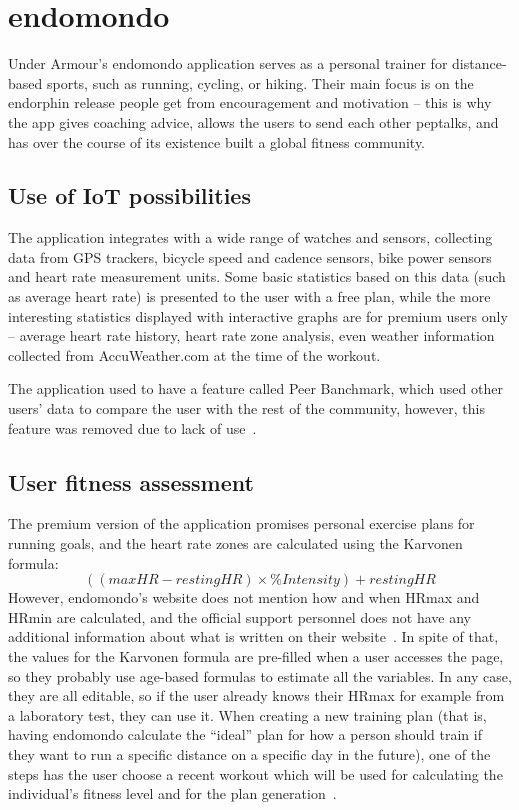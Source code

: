 \pagebreak
\section{endomondo}

Under Armour's endomondo application serves as a personal trainer for distance-based sports, such as running, cycling, or hiking.
Their main focus is on the endorphin release people get from encouragement and motivation -- this is why the app gives coaching advice, allows the users to send each other peptalks, and has over the course of its existence built a global fitness community.
\subsection*{Use of IoT possibilities}
The application integrates with a wide range of watches and sensors, collecting data from GPS trackers, bicycle speed and cadence sensors, bike power sensors and heart rate measurement units.
Some basic statistics based on this data (such as average heart rate) is presented to the user with a free plan, 
while the more interesting statistics displayed with interactive graphs are for premium users only -- average heart rate history, heart rate zone analysis, even weather information collected from AccuWeather.com at the time of the workout.

The application used to have a feature called Peer Banchmark, which used other users' data to compare the user with the rest of the community, however, this feature was removed due to lack of use~\cite{endomondo-HR-max-emails}.
\subsection*{User fitness assessment}
The premium version of the application promises personal exercise plans for running goals, and the heart rate zones are calculated using the Karvonen formula: 
\[((max HR − resting HR) × \% Intensity) + resting HR\]
However, endomondo's website does not mention how and when HRmax and HRmin are calculated, and the official support personnel does not have any additional information about what is written on their website~\cite{endomondo-HR-max-emails}.
In spite of that, the values for the Karvonen formula are pre-filled when a user accesses the page, so they probably use age-based formulas to estimate all the variables.
In any case, they are all editable, so if the user already knows their HRmax for example from a laboratory test, they can use it.
When creating a new training plan (that is, having endomondo calculate the ``ideal'' plan for how a person should train if they want to run a specific distance on a specific day in the future),
one of the steps has the user choose a recent workout which will be used for calculating the individual's fitness level and for the plan generation~\cite{endomondo-training-plan-fitness-assessment}.
